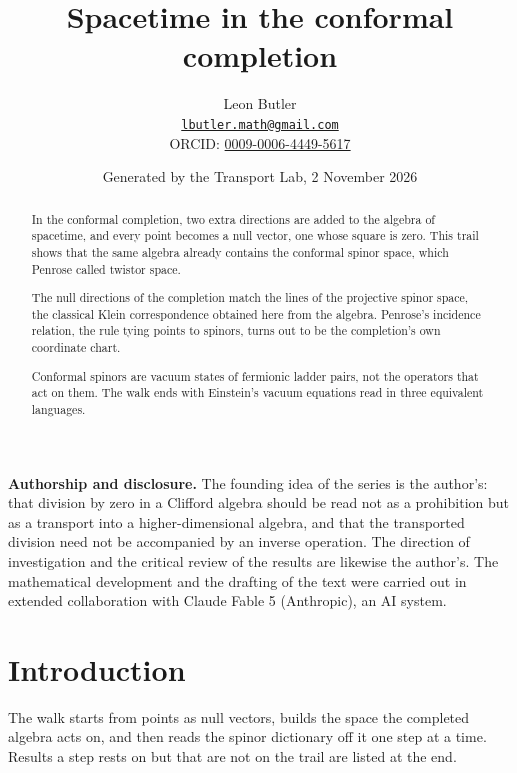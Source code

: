 \documentclass[11pt]{article}
\title{\bfseries Spacetime in the conformal completion}
\author{Leon Butler\\ \normalsize\href{mailto:lbutler.math@gmail.com}{\texttt{lbutler.math@gmail.com}}\\ \normalsize ORCID: \href{https://orcid.org/0009-0006-4449-5617}{0009-0006-4449-5617}}
\date{Generated by the Transport Lab, 2 November 2026}
\theoremstyle{definition}
\theoremstyle{plain}
\begin{document}
\maketitle
\begin{abstract}
\normalsize
In the conformal completion, two extra directions are added to the algebra of spacetime, and every point becomes a null vector, one whose square is zero. This trail shows that the same algebra already contains the conformal spinor space, which Penrose called twistor space.

The null directions of the completion match the lines of the projective spinor space, the classical Klein correspondence obtained here from the algebra. Penrose's incidence relation, the rule tying points to spinors, turns out to be the completion's own coordinate chart.

Conformal spinors are vacuum states of fermionic ladder pairs, not the operators that act on them. The walk ends with Einstein's vacuum equations read in three equivalent languages.
\end{abstract}
\newpage
\noindent \textbf{Authorship and disclosure. }The founding idea of the series is the author's: that division by zero in a Clifford algebra should be read not as a prohibition but as a transport into a higher-dimensional algebra, and that the transported division need not be accompanied by an inverse operation. The direction of investigation and the critical review of the results are likewise the author's. The mathematical development and the drafting of the text were carried out in extended collaboration with Claude Fable 5 (Anthropic), an AI system.

\noindent{}
\newpage

\section*{Introduction}
The walk starts from points as null vectors, builds the space the completed algebra acts on, and then reads the spinor dictionary off it one step at a time. Results a step rests on but that are not on the trail are listed at the end.
\end{document}
